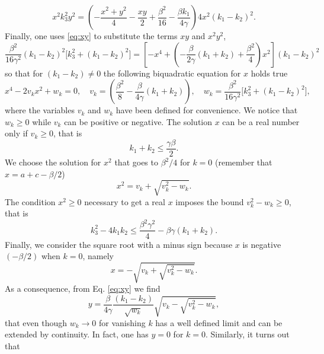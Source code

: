 \documentclass[a4paper,11pt]{article}
\numberwithin{equation}{section}
\begin{document}
\begin{equation*}
    x^2 k_3^2  y^2  = \left( - \frac{x^2 +y^2}{4} -\frac{xy}{2} +\frac{\beta^2}{16} - \frac{\beta k_1}{4\gamma} \right) 4 x^2 (k_1 -k_2)^2 .
\end{equation*}
Finally, one uses \eqref{eq:xy} to substitute the terms $xy$ and $x^2y^2$, 
\begin{equation*}
    \frac{\beta^2}{16\gamma^2} (k_1 -k_2)^2 \big[ k_3^2 + (k_1 -k_2)^2 \big] =\left[ - x^4  + \left( -\frac{\beta}{2\gamma}(k_1 +k_2)  + \frac{\beta^2}{4} \right) x^2 \right] (k_1 -k_2)^2 
\end{equation*}
so that for $(k_1 - k_2) \neq 0$ the following biquadratic equation for $x$ holds true
\begin{equation}
    x^4 - 2 v_k  x^2 + w_k =0, \quad v_k = \left( \frac{\beta^2}{8} -\frac{\beta}{4\gamma}(k_1 +k_2)   \right) , \quad w_k = \frac{\beta^2}{16\gamma^2}\big[ k_3^2 + (k_1 -k_2)^2 \big],
\end{equation}
where the variables $v_k$ and $w_k$ have been defined for convenience. We notice that $w_k \geq 0$ while $v_k$ can be positive or negative. The solution $x$ can be a real number only if $v_k \geq 0$, that is
\begin{equation}\label{eq:bound1}
    k_1+k_2 \leq \frac{\gamma\beta}{2}.
\end{equation}
We choose the solution for $x^2$ that goes to $\beta^2/4$ for $k=0$ (remember that $x= a+c -\beta/2$)
\begin{equation}
    x^2 = v_k + \sqrt{v_k^2 - w_k} .
\end{equation}
The condition $x^2 \geq 0$ necessary to get a real $x$ imposes the bound $v_k^2- w_k \geq 0$, that is
\begin{equation}\label{eq:bound2}
   k_3^2 - 4 k_1k_2   \leq \frac{\beta^2\gamma^2}{4} -  \beta \gamma(k_1+k_2).
\end{equation}
Finally, we consider the square root with a minus sign because $x$ is negative $(-\beta/2)$ when $k=0$, namely
\begin{equation}
    x= - \sqrt{  v_k + \sqrt{v_k^2 - w_k}}.
\end{equation}
As a consequence, from Eq. \eqref{eq:xy} we find
\begin{equation}
    y= \frac{\beta}{4\gamma} \frac{(k_1 - k_2)}{\sqrt{w_k}}\sqrt{  v_k - \sqrt{v_k^2 - w_k}}, 
\end{equation}
that even though $w_k \to 0$ for vanishing $k$ has a well defined limit and can be extended by continuity. In fact, one has $y=0$ for $k=0$. Similarly, it turns out that
\end{document}

